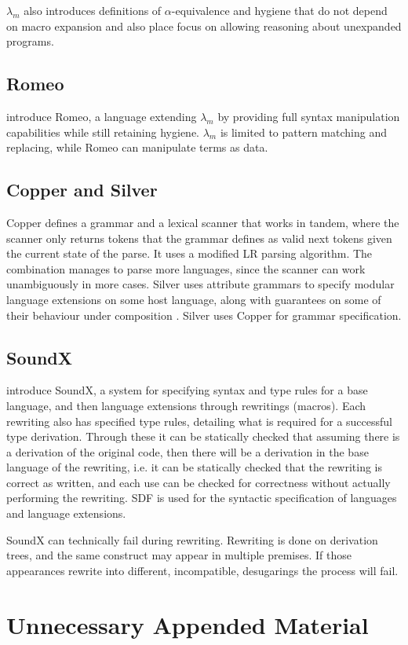 \documentclass{kththesis}
\begin{document}
$\lambda_m$ also introduces definitions of $\alpha$-equivalence and hygiene that do not depend on macro expansion and also place focus on allowing reasoning about unexpanded programs.

\section{Romeo}

\textcite{Stansifer2014} introduce Romeo, a language extending $\lambda_m$ by providing full syntax manipulation capabilities while still retaining hygiene. $\lambda_m$ is limited to pattern matching and replacing, while Romeo can manipulate terms as data.

\section{Copper and Silver}

Copper \cite{VanWyk2007} defines a grammar and a lexical scanner that works in tandem, where the scanner only returns tokens that the grammar defines as valid next tokens given the current state of the parse. It uses a modified LR parsing algorithm. The combination manages to parse more languages, since the scanner can work unambiguously in more cases. Silver \cite{VanWyk2010} uses attribute grammars to specify modular language extensions on some host language, along with guarantees on some of their behaviour under composition \cite{Kaminski2017}. Silver uses Copper for grammar specification.

\section{SoundX}

\textcite{Lorenzen2016} introduce SoundX, a system for specifying syntax and type rules for a base language, and then language extensions through rewritings (macros). Each rewriting also has specified type rules, detailing what is required for a successful type derivation. Through these it can be statically checked that assuming there is a derivation of the original code, then there will be a derivation in the base language of the rewriting, i.e. it can be statically checked that the rewriting is correct as written, and each use can be checked for correctness without actually performing the rewriting. SDF is used for the syntactic specification of languages and language extensions.

SoundX can technically fail during rewriting. Rewriting is done on derivation trees, and the same construct may appear in multiple premises. If those appearances rewrite into different, incompatible, desugarings the process will fail.

\printbibliography[heading=bibintoc] %

\appendix

\chapter{Unnecessary Appended Material}
\end{document}

